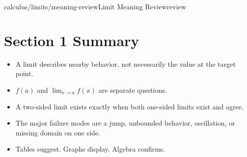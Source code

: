 \begin{webpage}{calculus/limits/meaning-review}{Limit Meaning Review}{review}
\section*{Section 1 Summary}

\begin{bgsummary}
\begin{itemize}
  \item A limit describes nearby behavior, not necessarily the value at the target point.
  \item \(f(a)\) and \(\lim_{x\to a}f(x)\) are separate questions.
  \item A two-sided limit exists exactly when both one-sided limits exist and agree.
  \item The major failure modes are a jump, unbounded behavior, oscillation, or missing domain on one side.
  \item Tables suggest. Graphs display. Algebra confirms.
\end{itemize}
\end{bgsummary}
\end{webpage}

